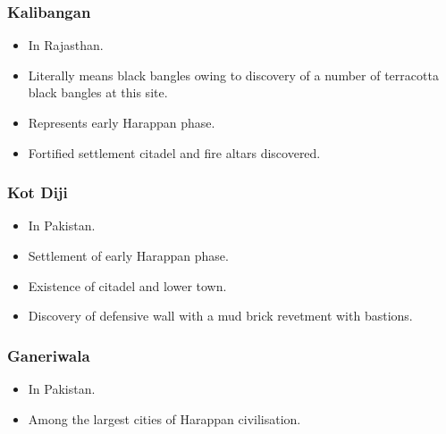 \documentclass[8pt, a4paper, oneside, twocolumn]{extarticle}
\begin{document}
\subsubsection{Kalibangan}
\begin{itemize}
  \item In Rajasthan.
  \item Literally means black bangles owing to discovery of a number of terracotta black bangles at this site.
  \item Represents early Harappan phase.
  \item Fortified settlement citadel and fire altars discovered.
\end{itemize}
\subsubsection{Kot Diji}
\begin{itemize}
  \item In Pakistan.
  \item Settlement of early Harappan phase.
  \item Existence of citadel and lower town.
  \item Discovery of defensive wall with a mud brick revetment with bastions.
\end{itemize}
\subsubsection{Ganeriwala}
\begin{itemize}
  \item In Pakistan.
  \item Among the largest cities of Harappan civilisation.
\end{itemize}
\end{document}
